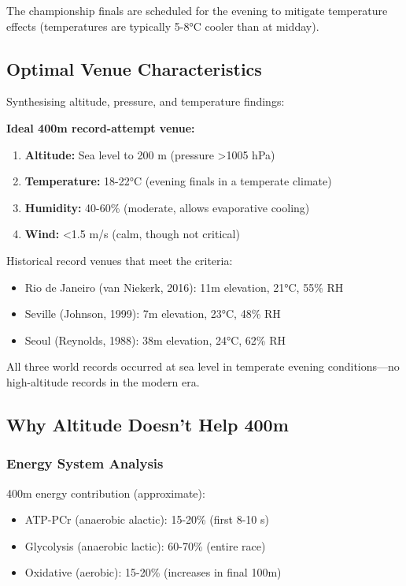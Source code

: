The championship finals are scheduled for the evening to mitigate temperature effects (temperatures are typically 5-8°C cooler than at midday).

\subsection{Optimal Venue Characteristics}

Synthesising altitude, pressure, and temperature findings:

\textbf{Ideal 400m record-attempt venue:}
\begin{enumerate}
    \item \textbf{Altitude:} Sea level to 200 m (pressure >1005 hPa)
    \item \textbf{Temperature:} 18-22°C (evening finals in a temperate climate)
    \item \textbf{Humidity:} 40-60\% (moderate, allows evaporative cooling)
    \item \textbf{Wind:} <1.5 m/s (calm, though not critical)
\end{enumerate}

Historical record venues that meet the criteria:
\begin{itemize}
    \item Rio de Janeiro (van Niekerk, 2016): 11m elevation, 21°C, 55\% RH \checkmark
    \item Seville (Johnson, 1999): 7m elevation, 23°C, 48\% RH \checkmark
    \item Seoul (Reynolds, 1988): 38m elevation, 24°C, 62\% RH \checkmark
\end{itemize}


All three world records occurred at sea level in temperate evening conditions—no high-altitude records in the modern era.

\subsection{Why Altitude Doesn't Help 400m}

\subsubsection{Energy System Analysis}

400m energy contribution (approximate):
\begin{itemize}
    \item ATP-PCr (anaerobic alactic): 15-20\% (first 8-10 s)
    \item Glycolysis (anaerobic lactic): 60-70\% (entire race)
    \item Oxidative (aerobic): 15-20\% (increases in final 100m)
\end{itemize}

